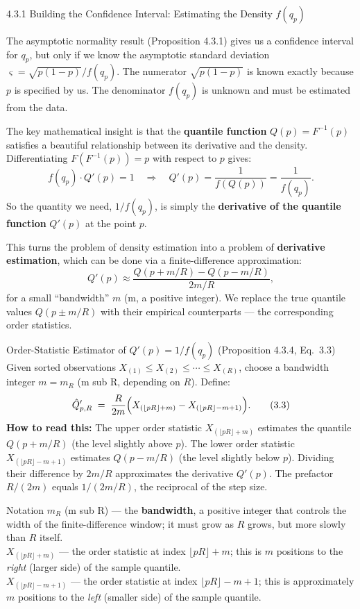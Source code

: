 \documentclass[aspectratio=169,10pt]{beamer}
\begin{document}
\begin{frame}[allowframebreaks]{4.3.1 Building the Confidence Interval: Estimating the Density $f(q_p)$}

The asymptotic normality result (Proposition 4.3.1) gives us a confidence interval
for $q_p$, but only if we know the asymptotic standard deviation $\varsigma = \sqrt{p(1-p)}/f(q_p)$.
The numerator $\sqrt{p(1-p)}$ is known exactly because $p$ is specified by us.
The denominator $f(q_p)$ is unknown and must be estimated from the data.

The key mathematical insight is that the \textbf{quantile function} $Q(p) = F^{-1}(p)$
satisfies a beautiful relationship between its derivative and the density.
Differentiating $F(F^{-1}(p)) = p$ with respect to $p$ gives:
\[
  f(q_p) \cdot Q'(p) = 1
  \quad\Longrightarrow\quad
  Q'(p) = \frac{1}{f(Q(p))} = \frac{1}{f(q_p)}.
\]
So the quantity we need, $1/f(q_p)$, is simply the \textbf{derivative of the
quantile function} $Q'(p)$ at the point $p$.

This turns the problem of density estimation into a problem of \textbf{derivative
estimation}, which can be done via a finite-difference approximation:
\[
  Q'(p) \approx \frac{Q(p + m/R) - Q(p - m/R)}{2m/R},
\]
for a small ``bandwidth'' $m$ (m, a positive integer).  We replace the true
quantile values $Q(p \pm m/R)$ with their empirical counterparts --- the
corresponding order statistics.

\begin{block}{Order-Statistic Estimator of $Q'(p) = 1/f(q_p)$ (Proposition 4.3.4, Eq.\ 3.3)}
  Given sorted observations $X_{(1)} \leq X_{(2)} \leq \cdots \leq X_{(R)}$,
  choose a bandwidth integer $m = m_R$ (m sub R, depending on $R$).  Define:
  \[
    \hat{Q}'_{p,R} \;=\; \frac{R}{2m}
      \Bigl(X_{(\lfloor pR \rfloor + m)} - X_{(\lfloor pR \rfloor - m + 1)}\Bigr).
      \tag{3.3}
  \]
  \textbf{How to read this:}
  The upper order statistic $X_{(\lfloor pR \rfloor + m)}$ estimates the
  quantile $Q(p + m/R)$ (the level slightly above $p$).
  The lower order statistic $X_{(\lfloor pR \rfloor - m + 1)}$ estimates
  $Q(p - m/R)$ (the level slightly below $p$).
  Dividing their difference by $2m/R$ approximates the derivative $Q'(p)$.
  The prefactor $R/(2m)$ equals $1/(2m/R)$, the reciprocal of the step size.
\end{block}

\begin{block}{Notation}
  $m_R$ (m sub R) --- the \textbf{bandwidth}, a positive integer that controls
  the width of the finite-difference window; it must grow as $R$ grows, but
  more slowly than $R$ itself.\\[4pt]
  $X_{(\lfloor pR \rfloor + m)}$ --- the order statistic at index $\lfloor pR \rfloor + m$;
  this is $m$ positions to the \emph{right} (larger side) of the sample quantile.\\[4pt]
  $X_{(\lfloor pR \rfloor - m + 1)}$ --- the order statistic at index $\lfloor pR \rfloor - m + 1$;
  this is approximately $m$ positions to the \emph{left} (smaller side) of the
  sample quantile.
\end{block}


\end{frame}
\end{document}
